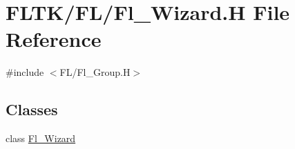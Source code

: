 \hypertarget{_fl___wizard_8_h}{}\section{F\+L\+T\+K/\+F\+L/\+Fl\+\_\+\+Wizard.H File Reference}
\label{_fl___wizard_8_h}
{\ttfamily \#include $<$F\+L/\+Fl\+\_\+\+Group.\+H$>$}\newline
\subsection*{Classes}
\begin{DoxyCompactItemize}
\item 
class \hyperlink{class_fl___wizard}{Fl\+\_\+\+Wizard}
\end{DoxyCompactItemize}
